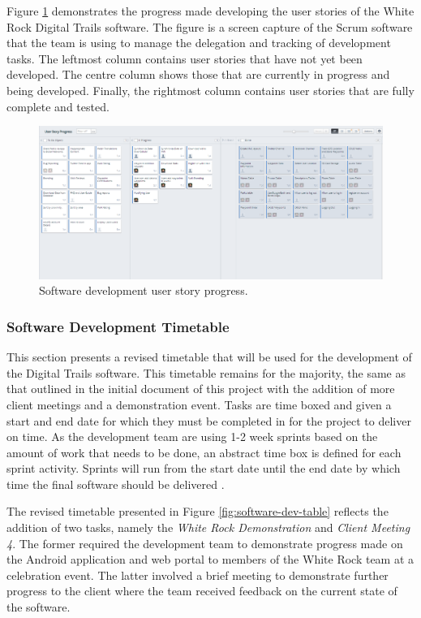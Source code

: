 \documentclass[11pt,a4paper]{article}
\begin{document}
Figure \ref{fig:UserStoryProgress} demonstrates the progress made developing the user stories of the White Rock Digital Trails software. The figure is a screen capture of the Scrum software that the team is using to manage the delegation and tracking of development tasks. The leftmost column contains user stories that have not yet been developed. The centre column shows those that are currently in progress and being developed. Finally, the rightmost column contains user stories that are fully complete and tested.

\begin{figure}[H]
\centering
\includegraphics[width=0.9\linewidth]{./img/UserStoryProgress}
\caption{Software development user story progress.}
\label{fig:UserStoryProgress}
\end{figure}


\subsubsection{Software Development Timetable}
\label{sec:plan-software-dev}

This section presents a revised timetable that will be used for the development of the Digital Trails software. This timetable remains for the majority, the same as that outlined in the initial document of this project with the addition of more client meetings and a demonstration event. Tasks are time boxed and given a start and end date for which they must be completed in for the project to deliver on time. As the development team are using 1-2 week sprints based on the amount of work that needs to be done, an abstract time box is defined for each sprint activity. Sprints will run from the start date until the end date by which time the final software should be delivered \cite{initialDoc}.

The revised timetable presented in Figure \ref{fig:software-dev-table} reflects the addition of two tasks, namely the \emph{White Rock Demonstration} and \emph{Client Meeting 4}. The former required the development team to demonstrate progress made on the Android application and web portal to members of the White Rock team at a celebration event. The latter involved a brief meeting to demonstrate further progress to the client where the team received feedback on the current state of the software.
\end{document}
